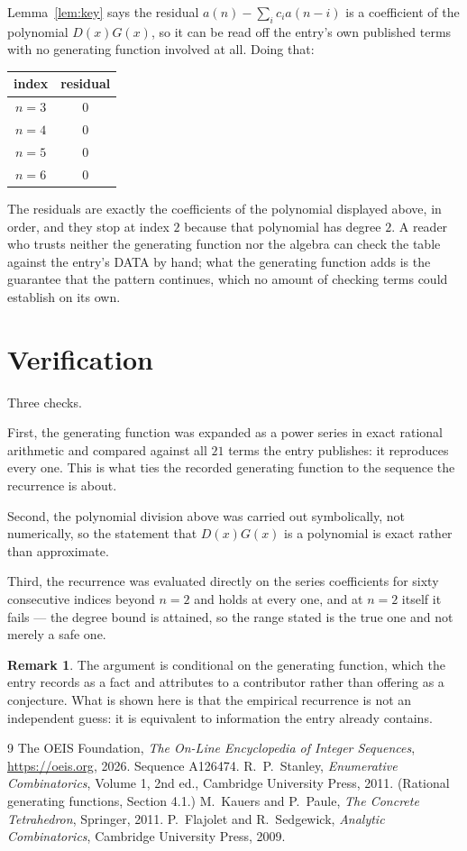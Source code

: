 \documentclass[11pt,a4paper]{article}
\theoremstyle{plain}
\theoremstyle{definition}
\newtheorem{remark}[theorem]{Remark}
\begin{document}
Lemma~\ref{lem:key} says the residual $a(n)-\sum_ic_ia(n-i)$ is a coefficient of the
polynomial $D(x)G(x)$, so it can be read off the entry's own published terms with no
generating function involved at all. Doing that:
\begin{center}
\begin{tabular}{cc}
index & residual \\ \hline
$n=3$ & $0$ \\
$n=4$ & $0$ \\
$n=5$ & $0$ \\
$n=6$ & $0$
\end{tabular}
\end{center}
The residuals are exactly the coefficients of the polynomial displayed above, in order, and
they stop at index $2$ because that polynomial has degree $2$. A reader who trusts
neither the generating function nor the algebra can check the table against the entry's DATA
by hand; what the generating function adds is the guarantee that the pattern continues, which
no amount of checking terms could establish on its own.

\section{Verification}

Three checks.

First, the generating function was expanded as a power series in exact rational arithmetic and
compared against all $21$ terms the entry publishes: it reproduces every one. This is
what ties the recorded generating function to the sequence the recurrence is about.

Second, the polynomial division above was carried out symbolically, not numerically, so the
statement that $D(x)G(x)$ is a polynomial is exact rather than approximate.

Third, the recurrence was evaluated directly on the series coefficients for sixty consecutive
indices beyond $n=2$ and holds at every one, and at $n=2$ itself it fails --- the
degree bound is attained, so the range stated is the true one and not merely a safe one.

\begin{remark}
The argument is conditional on the generating function, which the entry records as a fact and
attributes to a contributor rather than offering as a conjecture. What is shown here is that
the empirical recurrence is not an independent guess: it is equivalent to information the
entry already contains.
\end{remark}

\begin{thebibliography}{9}
 The OEIS Foundation, \emph{The On-Line Encyclopedia of Integer
Sequences}, \url{https://oeis.org}, 2026. Sequence A126474.
 R.~P.~Stanley, \emph{Enumerative Combinatorics}, Volume 1, 2nd ed.,
Cambridge University Press, 2011. (Rational generating functions, Section 4.1.)
 M.~Kauers and P.~Paule, \emph{The Concrete Tetrahedron}, Springer, 2011.
 P.~Flajolet and R.~Sedgewick, \emph{Analytic Combinatorics}, Cambridge
University Press, 2009.
\end{thebibliography}
\end{document}
